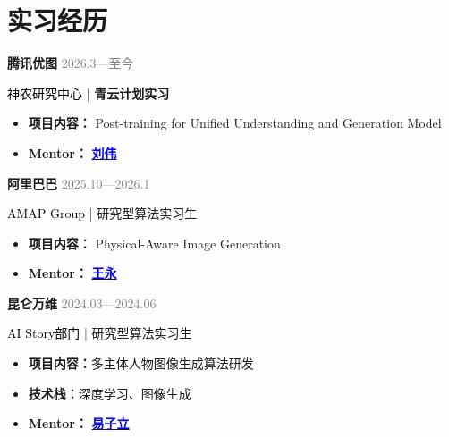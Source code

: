 \documentclass{resume}
\begin{document}
\vspace{8pt}


\section{\textbf{实习经历}}


\noindent\textbf{腾讯优图}
\hfill \textcolor{gray}{2026.3—至今}

\noindent\textcolor{black}{神农研究中心} | \textbf{青云计划实习}

\begin{itemize}
  \item \textbf{项目内容：} Post-training for Unified Understanding and Generation Model
  \item \textbf{Mentor：} \href{https://scholar.google.com/citations?user=3to3lqMAAAAJ&hl=en}{\textcolor{blue}{\textbf{刘伟}}}
\end{itemize}

\vspace{0.4em}


\noindent\textbf{阿里巴巴}
\hfill \textcolor{gray}{2025.10—2026.1}

\noindent\textcolor{black}{AMAP Group} | 研究型算法实习生

\begin{itemize}
  \item \textbf{项目内容：} Physical-Aware Image Generation
  \item \textbf{Mentor：} \href{https://scholar.google.com/citations?user=rAtlzLcAAAAJ&hl=zh-CN}{\textcolor{blue}{\textbf{王永}}}
\end{itemize}

\vspace{0.4em}

\noindent\textbf{昆仑万维}
\hfill \textcolor{gray}{2024.03—2024.06}

\noindent\textcolor{black}{AI Story部门} | 研究型算法实习生

\begin{itemize}
  \item \textbf{项目内容：}多主体人物图像生成算法研发
  \item \textbf{技术栈：}深度学习、图像生成
  \item \textbf{Mentor：} \href{https://scholar.google.com/citations?user=XC6Z56AAAAAJ&hl=en}{\textcolor{blue}{\textbf{易子立}}}
\end{itemize}

\vspace{0.4em}
\end{document}
